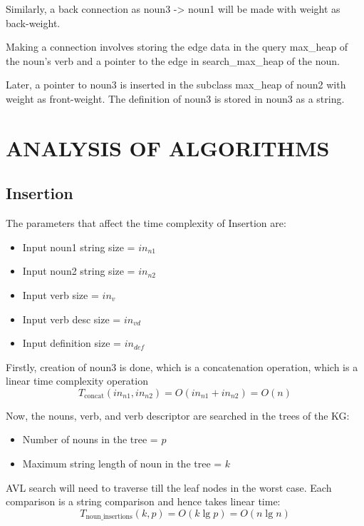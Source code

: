 \documentclass[conference]{IEEEtran}
\begin{document}
Similarly, a back connection as noun3 -> noun1 will be made with weight as back-weight.

Making a connection involves storing the edge data in the query max\_heap of the noun's verb and a pointer to the edge in search\_max\_heap of the noun.

Later, a pointer to noun3 is inserted in the subclass max\_heap of noun2 with weight as front-weight.
The definition of noun3 is stored in noun3 as a string.

\section{ANALYSIS OF ALGORITHMS}
\subsection{Insertion}
The parameters that affect the time complexity of Insertion are:
\begin{itemize}
    \item Input noun1 string size = $in_{n1}$
    \item Input noun2 string size = $in_{n2}$
    \item Input verb size = $in_{v}$
    \item Input verb desc size = $in_{vd}$
    \item Input definition size = $in_{def}$
\end{itemize}

Firstly, creation of noun3 is done, which is a concatenation operation, which is a linear time complexity operation
\\
\begin{equation}
	T_{\text{concat}}(in_{n1}, in_{n2}) = O(in_{n1} + in_{n2}) = O(n)
\end{equation}

Now, the nouns, verb, and verb descriptor are searched in the trees of the KG:
\begin{itemize}
    \item Number of nouns in the tree = $p$
    \item Maximum string length of noun in the tree = $k$
\end{itemize}
AVL search will need to traverse till the leaf nodes in the worst case. Each comparison is a string comparison and hence takes linear time:
\begin{equation}
	T_{\text{noun\_insertions}}(k, p) = O(k \lg p) = O(n \lg n)
\end{equation}
\end{document}
